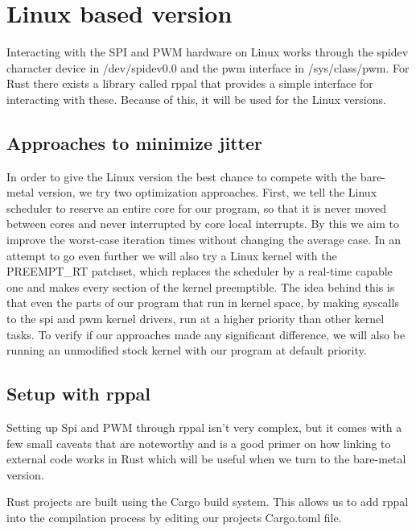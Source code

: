 \section{Linux based version}
\label{sec:concept_and_implementation:linux}

Interacting with the SPI and PWM hardware on Linux works through the spidev character device in /dev/spidev0.0 and the pwm interface in /sys/class/pwm.
For Rust there exists a library called rppal that provides a simple interface for interacting with these.
Because of this, it will be used for the Linux versions.

\subsection{Approaches to minimize jitter}
\label{sec:concept_and_implementation:linux:approaches}

In order to give the Linux version the best chance to compete with the bare-metal version, we try two optimization approaches.
First, we tell the Linux scheduler to reserve an entire core for our program, so that it is never moved between cores and never interrupted by core local interrupts.
By this we aim to improve the worst-case iteration times without changing the average case.
In an attempt to go even further we will also try a Linux kernel with the PREEMPT\_RT patchset,
which replaces the scheduler by a real-time capable one and makes every section of the kernel preemptible.
The idea behind this is that even the parts of our program that run in kernel space,
by making syscalls to the spi and pwm kernel drivers, run at a higher priority than other kernel tasks.
To verify if our approaches made any significant difference, we will also be running an unmodified stock kernel with our program at default priority.

\subsection{Setup with rppal}
\label{sec:concept_and_implementation:linux:rppal}

Setting up Spi and PWM through rppal isn't very complex,
but it comes with a few small caveats that are noteworthy
and is a good primer on how linking to external code works in Rust which will be useful when we turn to the bare-metal version.

Rust projects are built using the Cargo build system. This allows us to add rppal into the compilation process by editing our projects Cargo.toml file.

